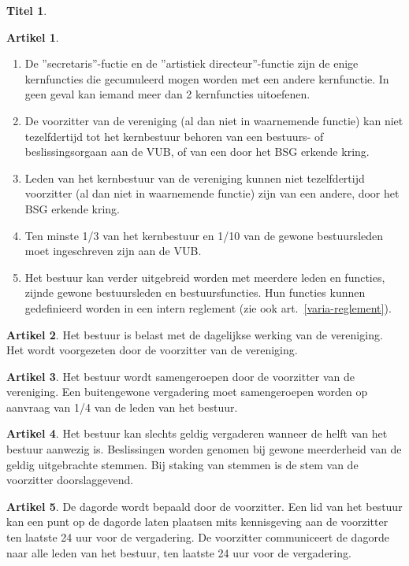 \documentclass[a4paper,10pt]{article}
\theoremstyle{definition}
\newtheorem{titel}{\newline\Large Titel}
\newtheorem{artikel}{\large Artikel}
\newcommand{\ttextcr}{\hfill\newline}
\begin{document}
\begin{titel}
\begin{artikel}
\begin{enumerate}
      \item
        De ''secretaris''-fuctie en de ''artistiek directeur''-functie zijn de enige kernfuncties die gecumuleerd mogen worden met een andere kernfunctie.
        In geen geval kan iemand meer dan 2 kernfuncties uitoefenen.
      \item De voorzitter van de vereniging (al dan niet in waarnemende functie) kan niet tezelfdertijd tot het kernbestuur behoren van een bestuurs- of beslissingsorgaan aan de VUB, of van een door het BSG erkende kring.
      \item Leden van het kernbestuur van de vereniging kunnen niet tezelfdertijd voorzitter (al dan niet in waarnemende functie) zijn van een andere, door het BSG erkende kring. %
      \item Ten minste 1/3 van het kernbestuur en 1/10 van de gewone bestuursleden moet ingeschreven zijn aan de VUB.
      \item Het bestuur kan verder uitgebreid worden met meerdere leden en functies, zijnde gewone bestuursleden en bestuursfuncties.
        Hun functies kunnen gedefinieerd worden in een intern reglement (zie ook art.~\ref{varia-reglement}).
    \end{enumerate}
  \end{artikel}

  \begin{artikel}\ttextcr
    Het bestuur is belast met de dagelijkse werking van de vereniging.
    Het wordt voorgezeten door de voorzitter van de vereniging.
  \end{artikel}

  \begin{artikel}\ttextcr
    Het bestuur wordt samengeroepen door de voorzitter van de vereniging.
    Een buitengewone vergadering moet samengeroepen worden op aanvraag van 1/4 van de leden van het bestuur.
  \end{artikel}

  \begin{artikel}\ttextcr
    Het bestuur kan slechts geldig vergaderen wanneer de helft van het bestuur aanwezig is.
    Beslissingen worden genomen bij gewone meerderheid van de geldig uitgebrachte stemmen.
    Bij staking van stemmen is de stem van de voorzitter doorslaggevend.
  \end{artikel}

  \begin{artikel}\ttextcr
    De dagorde wordt bepaald door de voorzitter.
    Een lid van het bestuur kan een punt op de dagorde laten plaatsen mits kennisgeving aan de voorzitter ten laatste 24 uur voor de vergadering.
    De voorzitter communiceert de dagorde naar alle leden van het bestuur, ten laatste 24 uur voor de vergadering.
  \end{artikel}


\end{titel}
\end{document}
